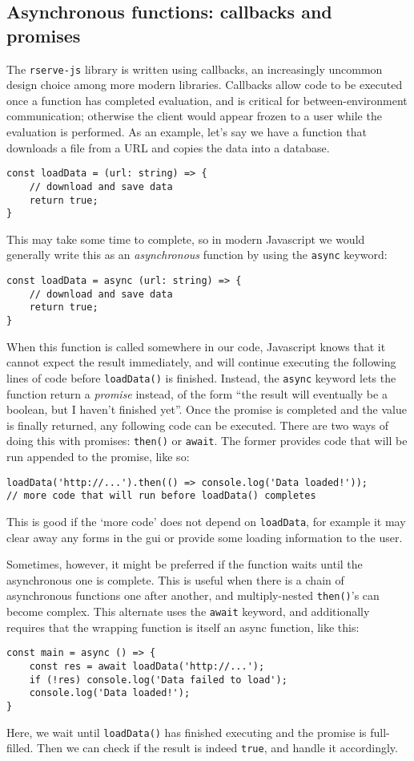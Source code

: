 \documentclass{article}
\newcommand{\pkg}[1]{\texttt{#1}}
\begin{document}
\subsection{Asynchronous functions: callbacks and promises}
\label{sec:async}

The \pkg{rserve-js} library is written using callbacks, an increasingly uncommon design choice among more modern libraries.
Callbacks allow code to be executed once a function has completed evaluation, and is critical for between-environment communication;
otherwise the client would appear frozen to a user while the evaluation is performed.
As an example, let's say we have a function that downloads a file from a URL and copies the data into a database.
\begin{verbatim}
const loadData = (url: string) => {
    // download and save data
    return true;
}
\end{verbatim}
This may take some time to complete, so in modern Javascript we would generally write this as an \emph{asynchronous} function by using the \verb+async+ keyword:
\begin{verbatim}
const loadData = async (url: string) => {
    // download and save data
    return true;
}
\end{verbatim}
When this function is called somewhere in our code, Javascript knows that it cannot expect the result immediately, and will continue executing the following lines of code before \verb+loadData()+ is finished.
Instead, the \verb+async+ keyword lets the function return a \emph{promise} instead, of the form ``the result will eventually be a boolean, but I haven't finished yet''.
Once the promise is completed and the value is finally returned, any following code can be executed.
There are two ways of doing this with promises: \verb+then()+ or \verb+await+.
The former provides code that will be run appended to the promise, like so:
\begin{verbatim}
loadData('http://...').then(() => console.log('Data loaded!'));
// more code that will run before loadData() completes
\end{verbatim}
This is good if the `more code' does not depend on \verb+loadData+, for example it may clear away any forms in the \gls{gui} or provide some loading information to the user.

Sometimes, however, it might be preferred if the function waits until the asynchronous one is complete.
This is useful when there is a chain of asynchronous functions one after another, and multiply-nested \verb+then()+'s can become complex.
This alternate uses the \verb+await+ keyword, and additionally requires that the wrapping function is itself an async function, like this:
\begin{verbatim}
const main = async () => {
    const res = await loadData('http://...');
    if (!res) console.log('Data failed to load');
    console.log('Data loaded!');
}
\end{verbatim}
Here, we wait until \verb+loadData()+ has finished executing and the promise is full-filled.
Then we can check if the result is indeed \verb+true+, and handle it accordingly.
\end{document}
